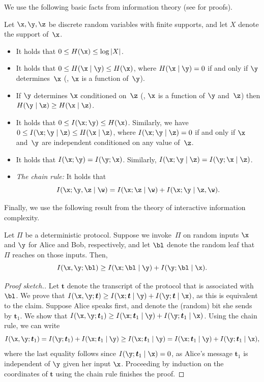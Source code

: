 We use the following basic facts from information theory (see \cite{CT91}
for proofs). 
\begin{fact}
\label{fact:information-properties}Let $\x,\y,\z$ be discrete random
variables with finite supports, and let $X$ denote the support of~$\x$. 
\begin{itemize}
\item It holds that $0\le H(\x)\le\log\left|X\right|$. 
\item It holds that $0\le H(\x\mid\y)\le H(\x)$, where $H(\x\mid\y)=0$
if and only if $\y$ determines~$\x$ (\ie, $\x$ is a function
of~$\y$). 
\item If $\y$ determines $\x$ conditioned on~$\z$ (\ie, $\x$ is a
function of $\y$ and~$\z$) then $H(\y\mid\z)\ge H(\x\mid\z)$. 
\item It holds that $0\le I(\x;\y)\le H(\x)$. Similarly, we have
$0\le I(\x;\y\mid\z)\le H(\x\mid\z)$, where $I(\x;\y\mid\z)=0$ if
and only if $\x$ and~$\y$ are independent conditioned on any value
of~$\z$. 
\item It holds that $I(\x;\y)=I(\y;\x)$. Similarly, $I(\x;\y\mid\z)=I(\y;\x\mid\z)$. 
\item \emph{The chain rule:} It holds that 
\[
I(\x;\y,\z\mid\w)=I(\x;\z\mid\w)+I(\x;\y\mid\z,\w).
\]
\end{itemize}
\end{fact}

Finally, we use the following result from the theory of interactive
information complexity. 
\begin{claim}
\label{claim:internal-vs-external-information}Let $\Pi$ be a deterministic
protocol. Suppose we invoke~$\Pi$ on random inputs $\x$ and $\y$
for Alice and Bob, respectively, and let $\bl$ denote the random
leaf that $\Pi$ reaches on those inputs. Then, 
\[
I(\x,\y;\bl)\ge I(\x;\bl\mid\y)+I(\y;\bl\mid\x).
\]
\end{claim}

\begin{proof}[Proof sketch.]
Let $\boldsymbol{t}$ denote the transcript of the protocol that
is associated with~$\bl$. We prove that $I(\x,\y;\boldsymbol{t})\ge I(\x;\boldsymbol{t}\mid\y)+I(\y;\boldsymbol{t}\mid\x)$,
as this is equivalent to the claim. Suppose Alice speaks first, and
denote the (random) bit she sends by $\boldsymbol{t}_{1}$. We show
that $I(\x,\y;\boldsymbol{t}_{1})\ge I(\x;\boldsymbol{t}_{1}\mid\y)+I(\y;\boldsymbol{t}_{1}\mid\x)$.
Using the chain rule, we can write 
\[
I(\x,\y;\boldsymbol{t}_{1})=I(\y;\boldsymbol{t}_{1})+I(\x;\boldsymbol{t}_{1}\mid\y)\geq I(\x;\boldsymbol{t}_{1}\mid\y)=I(\x;\boldsymbol{t}_{1}\mid\y)+I(\y;\boldsymbol{t}_{1}\mid\x),
\]
where the last equality follows since $I(\y;\boldsymbol{t}_{1}\mid\x)=0$,
as Alice's message $\boldsymbol{t}_{1}$ is independent of $\y$ given
her input $\x$. Proceeding by induction on the coordinates of $\boldsymbol{t}$
using the chain rule finishes the proof. 
\end{proof}

